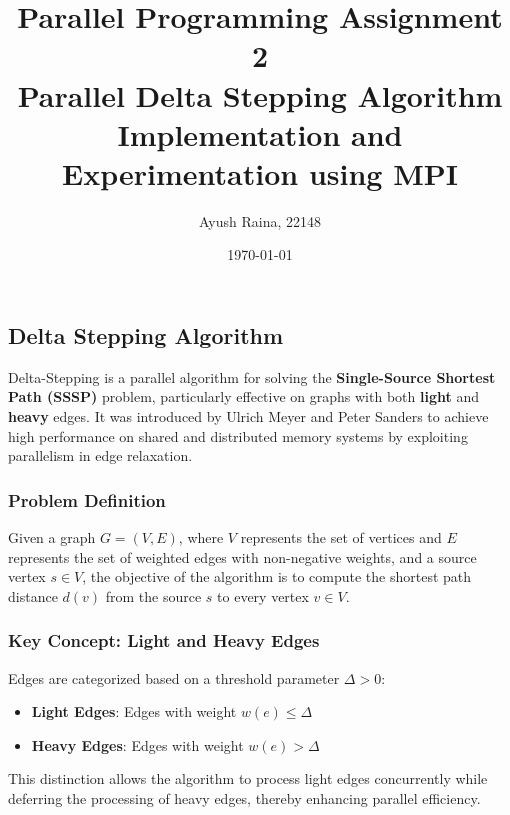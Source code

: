 \documentclass{article}
\title{Parallel Programming Assignment 2 \\ Parallel Delta Stepping Algorithm Implementation and Experimentation using MPI}
\author{Ayush Raina, 22148}
\date{\today}
\begin{document}
\maketitle
\subsection*{Delta Stepping Algorithm}

Delta-Stepping is a parallel algorithm for solving the \textbf{Single-Source Shortest Path (SSSP)} problem, particularly effective on graphs with both \textbf{light} and \textbf{heavy} edges. It was introduced by Ulrich Meyer and Peter Sanders to achieve high performance on shared and distributed memory systems by exploiting parallelism in edge relaxation.

\subsubsection*{Problem Definition}
Given a graph \( G = (V, E) \), where \( V \) represents the set of vertices and \( E \) represents the set of weighted edges with non-negative weights, and a source vertex \( s \in V \), the objective of the algorithm is to compute the shortest path distance \( d(v) \) from the source \( s \) to every vertex \( v \in V \).

\subsubsection*{Key Concept: Light and Heavy Edges}
Edges are categorized based on a threshold parameter \( \Delta > 0 \):
\begin{itemize}
    \item \textbf{Light Edges}: Edges with weight \( w(e) \leq \Delta \)
    \item \textbf{Heavy Edges}: Edges with weight \( w(e) > \Delta \)
\end{itemize}

This distinction allows the algorithm to process light edges concurrently while deferring the processing of heavy edges, thereby enhancing parallel efficiency.
\end{document}
